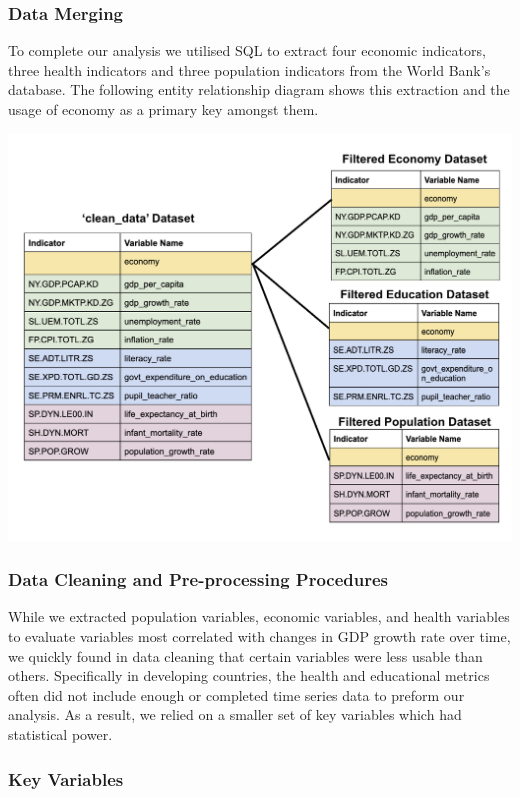 \documentclass[
  letterpaper,
  DIV=11,
  numbers=noendperiod]{scrartcl}
\begin{document}
\subsubsection{Data Merging}\label{data-merging}

To complete our analysis we utilised SQL to extract four economic
indicators, three health indicators and three population indicators from
the World Bank's database. The following entity relationship diagram
shows this extraction and the usage of economy as a primary key amongst
them.

\includegraphics[width=1\textwidth,height=\textheight]{documentation/Entity_Relationship_Diagram.png}

\subsubsection{Data Cleaning and Pre-processing
Procedures}\label{data-cleaning-and-pre-processing-procedures}

While we extracted population variables, economic variables, and health
variables to evaluate variables most correlated with changes in GDP
growth rate over time, we quickly found in data cleaning that certain
variables were less usable than others. Specifically in developing
countries, the health and educational metrics often did not include
enough or completed time series data to preform our analysis. As a
result, we relied on a smaller set of key variables which had
statistical power.

\subsubsection{Key Variables}\label{key-variables}
\end{document}
